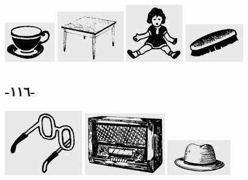 \documentclass[a5paper]{article}
\begin{document}
 \includegraphics[width=0.8543in,height=0.6772in]{MuhammadBagauddinlatinized-img327.png}   \includegraphics[width=1.1354in,height=0.8646in]{MuhammadBagauddinlatinized-img328.png}   \includegraphics[width=0.9689in,height=0.9791in]{MuhammadBagauddinlatinized-img329.png}   \includegraphics[width=0.9898in,height=0.6457in]{MuhammadBagauddinlatinized-img330.png} 

\subsection{-١١٦-}
 \includegraphics[width=1.3228in,height=1.1043in]{MuhammadBagauddinlatinized-img331.png}   \includegraphics[width=1.3752in,height=1.0626in]{MuhammadBagauddinlatinized-img332.png}   \includegraphics[width=1.0835in,height=0.6043in]{MuhammadBagauddinlatinized-img333.png} 
\end{document}
